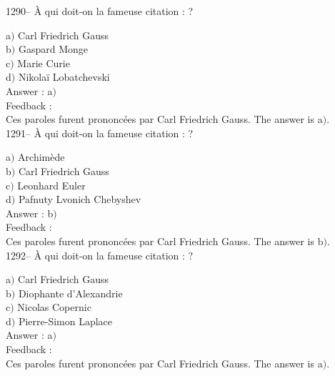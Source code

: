 ﻿\documentclass[letterpaper, 12pt]{article}
\begin{document}
1290-- \`A qui doit-on la fameuse citation : \fg ?

a$)$ Carl Friedrich Gauss \\
b$)$ Gaspard Monge \\
c$)$ Marie Curie \\
d$)$ Nikola\"i Lobatchevski\\

Answer : a$)$\\

Feedback :\\
Ces paroles furent prononc\'ees par Carl Friedrich
Gauss.
The answer is  a$)$.\\

1291-- \`A qui doit-on la fameuse citation : \fg?

a$)$ Archim\`ede \\
b$)$ Carl Friedrich Gauss \\
c$)$ Leonhard Euler \\
d$)$ Pafnuty Lvonich Chebyshev\\

Answer : b$)$\\

Feedback : \\
Ces paroles furent prononc\'ees par Carl Friedrich Gauss.
The answer is  b$)$.\\

1292-- \`A qui doit-on la fameuse citation : \fg ?

a$)$ Carl Friedrich Gauss \\
b$)$ Diophante d'Alexandrie \\
c$)$ Nicolas Copernic \\
d$)$ Pierre-Simon Laplace\\

Answer : a$)$\\

Feedback : \\
Ces paroles furent prononc\'ees par Carl Friedrich Gauss.
The answer is  a$)$.\\
\end{document}
